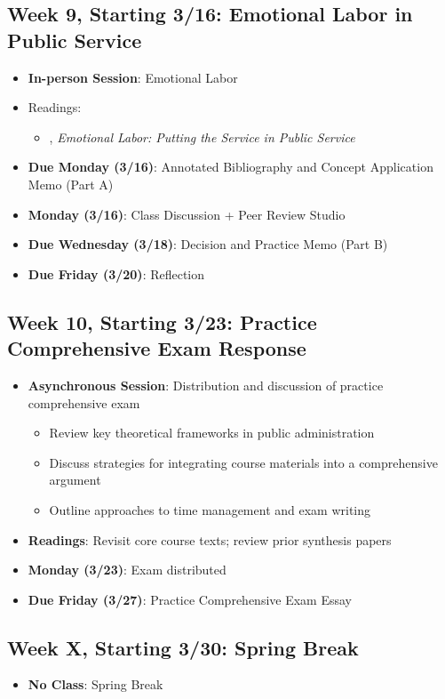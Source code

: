 \documentclass[11pt]{article}     %
\begin{document}
\subsection*{Week 9, Starting 3/16: Emotional Labor in Public Service}
\begin{itemize}
    \item \textbf{In-person Session}: Emotional Labor
    \item Readings:
        \begin{itemize}
            \item \cite{guy2008}, \emph{Emotional Labor: Putting the Service in Public Service}
        \end{itemize}
    \item \textbf{Due Monday (3/16)}: Annotated Bibliography and Concept Application Memo (Part A)
    \item \textbf{Monday (3/16)}: Class Discussion + Peer Review Studio
    \item \textbf{Due Wednesday (3/18)}: Decision and Practice Memo (Part B)
    \item \textbf{Due Friday (3/20)}: Reflection
\end{itemize}

\subsection*{Week 10, Starting 3/23: Practice Comprehensive Exam Response}
\begin{itemize}
    \item \textbf{Asynchronous Session}: Distribution and discussion of practice comprehensive exam
    \begin{itemize}
        \item Review key theoretical frameworks in public administration
        \item Discuss strategies for integrating course materials into a comprehensive argument
        \item Outline approaches to time management and exam writing
    \end{itemize}
    \item \textbf{Readings}: Revisit core course texts; review prior synthesis papers
    \item \textbf{Monday (3/23)}: Exam distributed
    \item \textbf{Due Friday (3/27)}: Practice Comprehensive Exam Essay
\end{itemize}

\subsection*{Week X, Starting 3/30: Spring Break}
\begin{itemize}
    \item \textbf{No Class}: Spring Break
\end{itemize}
\end{document}
